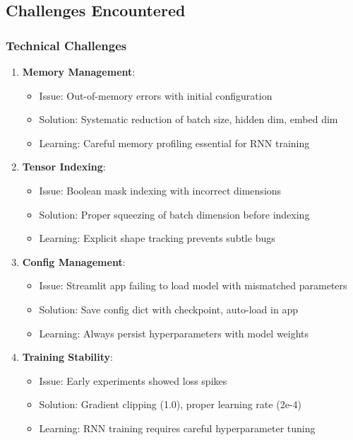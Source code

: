 \documentclass[12pt,a4paper]{article}
\begin{document}
\subsection{Challenges Encountered}

\subsubsection{Technical Challenges}

\begin{enumerate}
    \item \textbf{Memory Management}:
    \begin{itemize}
        \item Issue: Out-of-memory errors with initial configuration
        \item Solution: Systematic reduction of batch size, hidden dim, embed dim
        \item Learning: Careful memory profiling essential for RNN training
    \end{itemize}
    
    \item \textbf{Tensor Indexing}:
    \begin{itemize}
        \item Issue: Boolean mask indexing with incorrect dimensions
        \item Solution: Proper squeezing of batch dimension before indexing
        \item Learning: Explicit shape tracking prevents subtle bugs
    \end{itemize}
    
    \item \textbf{Config Management}:
    \begin{itemize}
        \item Issue: Streamlit app failing to load model with mismatched parameters
        \item Solution: Save config dict with checkpoint, auto-load in app
        \item Learning: Always persist hyperparameters with model weights
    \end{itemize}
    
    \item \textbf{Training Stability}:
    \begin{itemize}
        \item Issue: Early experiments showed loss spikes
        \item Solution: Gradient clipping (1.0), proper learning rate (2e-4)
        \item Learning: RNN training requires careful hyperparameter tuning
    \end{itemize}
\end{enumerate}
\end{document}
